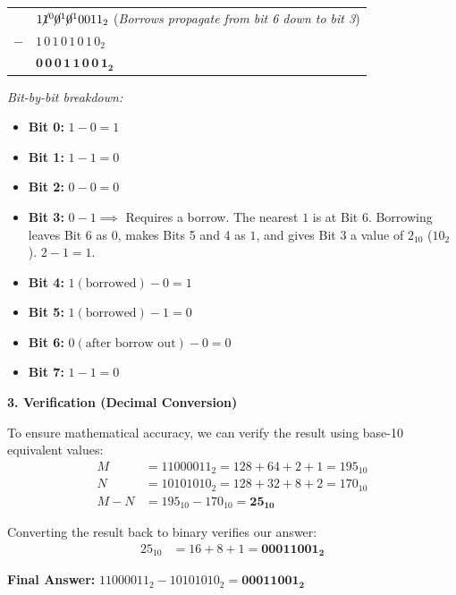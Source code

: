\documentclass[12pt,a3paper]{article}
\begin{document}
\begin{enumerate}
\begin{tcolorbox}[enhanced,breakable,ansbox,colback=cD!4,colframe=cD,boxrule=0.8pt,arc=5pt,title={\textbf{Answer}},fonttitle=\bfseries\color{white},colbacktitle=cD]
\begin{center}
\begin{tabular}{r@{\quad}l}
    & $1\cancel{1}^{0}\cancel{0}^{1}\cancel{0}^{1}0011_2$ \quad (\textit{Borrows propagate from bit 6 down to bit 3}) \\
  $-$ & $1\,0\,1\,0\,1\,0\,1\,0_2$ \\
  \midrule
    & $\mathbf{0\,0\,0\,1\,1\,0\,0\,1_2}$
\end{tabular}
\end{center}

\textit{Bit-by-bit breakdown:}
\begin{itemize}
    \item \textbf{Bit 0:} $1 - 0 = 1$
    \item \textbf{Bit 1:} $1 - 1 = 0$
    \item \textbf{Bit 2:} $0 - 0 = 0$
    \item \textbf{Bit 3:} $0 - 1 \implies$ Requires a borrow. The nearest $1$ is at Bit 6. Borrowing leaves Bit 6 as $0$, makes Bits 5 and 4 as $1$, and gives Bit 3 a value of $2_{10}$ ($10_2$). $2 - 1 = 1$.
    \item \textbf{Bit 4:} $1 (\text{borrowed}) - 0 = 1$
    \item \textbf{Bit 5:} $1 (\text{borrowed}) - 1 = 0$
    \item \textbf{Bit 6:} $0 (\text{after borrow out}) - 0 = 0$
    \item \textbf{Bit 7:} $1 - 1 = 0$
\end{itemize}

\vspace{1em}
\textbf{\textcolor{cD}{3. Verification (Decimal Conversion)}}

To ensure mathematical accuracy, we can verify the result using base-10 equivalent values:
\begin{align*}
    M &= 11000011_2 = 128 + 64 + 2 + 1 = 195_{10} \\
    N &= 10101010_2 = 128 + 32 + 8 + 2 = 170_{10} \\
    M - N &= 195_{10} - 170_{10} = \mathbf{25_{10}}
\end{align*}

Converting the result back to binary verifies our answer:
\begin{align*}
    25_{10} &= 16 + 8 + 1 = \mathbf{00011001_2}
\end{align*}

\vspace{0.5em}
\textbf{Final Answer:} $11000011_2 - 10101010_2 = \mathbf{00011001_2}$


\end{tcolorbox}
\end{enumerate}
\end{document}

